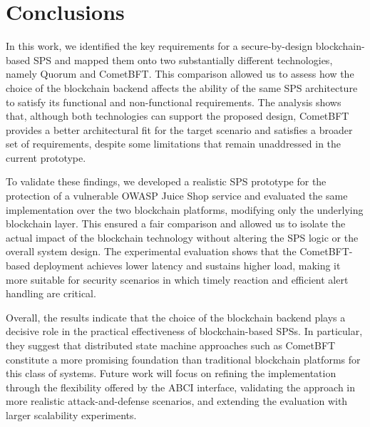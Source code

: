 \section{Conclusions}\label{sec:conclusions}
In this work, we identified the key requirements for a secure-by-design blockchain-based SPS and mapped them onto two substantially different technologies, namely Quorum and CometBFT. This comparison allowed us to assess how the choice of the blockchain backend affects the ability of the same SPS architecture to satisfy its functional and non-functional requirements. The analysis shows that, although both technologies can support the proposed design, CometBFT provides a better architectural fit for the target scenario and satisfies a broader set of requirements, despite some limitations that remain unaddressed in the current prototype.

To validate these findings, we developed a realistic SPS prototype for the protection of a vulnerable OWASP Juice Shop service and evaluated the same implementation over the two blockchain platforms, modifying only the underlying blockchain layer. This ensured a fair comparison and allowed us to isolate the actual impact of the blockchain technology without altering the SPS logic or the overall system design. The experimental evaluation shows that the CometBFT-based deployment achieves lower latency and sustains higher load, making it more suitable for security scenarios in which timely reaction and efficient alert handling are critical.

Overall, the results indicate that the choice of the blockchain backend plays a decisive role in the practical effectiveness of blockchain-based SPSs. In particular, they suggest that distributed state machine approaches such as CometBFT constitute a more promising foundation than traditional blockchain platforms for this class of systems. Future work will focus on refining the implementation through the flexibility offered by the ABCI interface, validating the approach in more realistic attack-and-defense scenarios, and extending the evaluation with larger scalability experiments.


